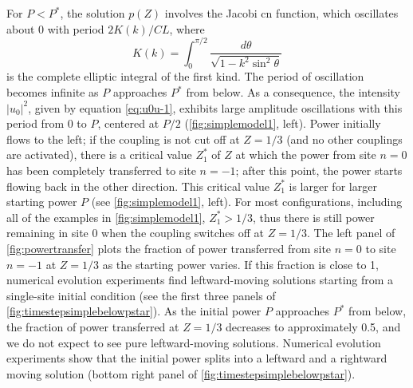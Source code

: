 \documentclass[reprint, amsmath,amssymb,aps,pre]{revtex4-2}
\begin{document}
For $P < P^*$, the solution $p(Z)$ involves the Jacobi cn function, which oscillates about 0 with period $2K(k)/CL$, where
\begin{equation}\label{eq:Kellipticint}
K(k) = \int_0^{\pi/2} \frac{d\theta}{\sqrt{1-k^2 \sin^2 \theta}}
\end{equation}
is the complete elliptic integral of the first kind. The period of oscillation becomes infinite as $P$ approaches $P^*$ from below.
As a consequence, the intensity $|u_0|^2$, given by equation \cref{eq:u0u-1}, exhibits large amplitude oscillations with this period from 0 to $P$, centered at $P/2$ (\cref{fig:simplemodel1}, left).
Power initially flows to the left; if the coupling is not cut off at $Z=1/3$ (and no other couplings are activated), there is a critical value $Z_1^*$ of $Z$ at which the power from site $n=0$ has been completely transferred to site $n=-1$; after this point, the power starts flowing back in the other direction. This critical value $Z_1^*$ is larger for larger starting power $P$ (see \cref{fig:simplemodel1}, left).
For most configurations, including all of the examples in \cref{fig:simplemodel1}, $Z_1^* > 1/3$, thus there is still power remaining in site 0 when the coupling switches off at $Z=1/3$. The left panel of \cref{fig:powertransfer} plots the fraction of power transferred from site $n=0$ to site $n=-1$ at $Z=1/3$ as the starting power varies. If this fraction is close to 1, numerical evolution experiments find leftward-moving solutions starting from a single-site initial condition (see the first three panels of \cref{fig:timestepsimplebelowpstar}). As the initial power $P$ approaches $P^*$ from below, the fraction of power transferred at $Z=1/3$ decreases to approximately 0.5, and we do not expect to see pure leftward-moving solutions. Numerical evolution experiments show that the initial power splits into a leftward and a rightward moving solution (bottom right panel of \cref{fig:timestepsimplebelowpstar}).
\end{document}
